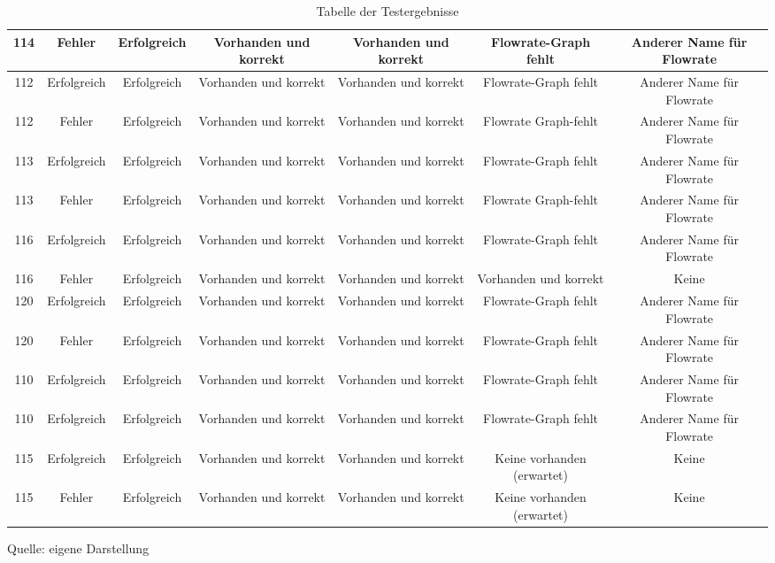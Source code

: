 \begin{table}[H]
{\begin{tabular}{|c|c|c|c|c|c|c|}
        \hline
        \rowcolor{yellow!15}
        114 & Fehler & Erfolgreich & Vorhanden und korrekt & Vorhanden und korrekt & Flowrate-Graph fehlt & Anderer Name für Flowrate \\
        \hline
        \rowcolor{yellow!15}
        112 & Erfolgreich & Erfolgreich & Vorhanden und korrekt & Vorhanden und korrekt & Flowrate-Graph fehlt & Anderer Name für Flowrate \\
        \hline
        \rowcolor{yellow!15}
        112 & Fehler & Erfolgreich & Vorhanden und korrekt & Vorhanden und korrekt & Flowrate Graph-fehlt & Anderer Name für Flowrate \\
        \hline
        \rowcolor{yellow!15}
        113 & Erfolgreich & Erfolgreich & Vorhanden und korrekt & Vorhanden und korrekt & Flowrate-Graph fehlt & Anderer Name für Flowrate \\
        \hline
        \rowcolor{yellow!15}
        113 & Fehler & Erfolgreich & Vorhanden und korrekt & Vorhanden und korrekt & Flowrate Graph-fehlt & Anderer Name für Flowrate \\
        \hline
        \rowcolor{yellow!15}
        116 & Erfolgreich & Erfolgreich & Vorhanden und korrekt & Vorhanden und korrekt & Flowrate-Graph fehlt & Anderer Name für Flowrate \\
        \hline
        \rowcolor{green!15}
        116 & Fehler & Erfolgreich & Vorhanden und korrekt & Vorhanden und korrekt & Vorhanden und korrekt & Keine \\
        \hline
        \rowcolor{yellow!15}
        120 & Erfolgreich & Erfolgreich & Vorhanden und korrekt & Vorhanden und korrekt & Flowrate-Graph fehlt & Anderer Name für Flowrate \\
        \hline
        \rowcolor{yellow!15}
        120 & Fehler & Erfolgreich & Vorhanden und korrekt & Vorhanden und korrekt & Flowrate-Graph fehlt & Anderer Name für Flowrate \\
        \hline
        \rowcolor{yellow!15}
        110 & Erfolgreich & Erfolgreich & Vorhanden und korrekt & Vorhanden und korrekt & Flowrate-Graph fehlt & Anderer Name für Flowrate \\
        \hline
        \rowcolor{yellow!15}
        110 & Erfolgreich & Erfolgreich & Vorhanden und korrekt & Vorhanden und korrekt & Flowrate-Graph fehlt & Anderer Name für Flowrate \\
        \hline
        \rowcolor{green!15}
        115 & Erfolgreich & Erfolgreich & Vorhanden und korrekt & Vorhanden und korrekt & Keine vorhanden (erwartet) & Keine \\
        \hline
        \rowcolor{green!15}
        115 & Fehler & Erfolgreich & Vorhanden und korrekt & Vorhanden und korrekt & Keine vorhanden (erwartet) & Keine \\
        \hline
    \end{tabular}
    } %
    \caption{Tabelle der Testergebnisse}
    \label{tab: Tabelle der Testergebnisse}
    \vspace{0.2cm}
    {Quelle: eigene Darstellung}
\end{table}


